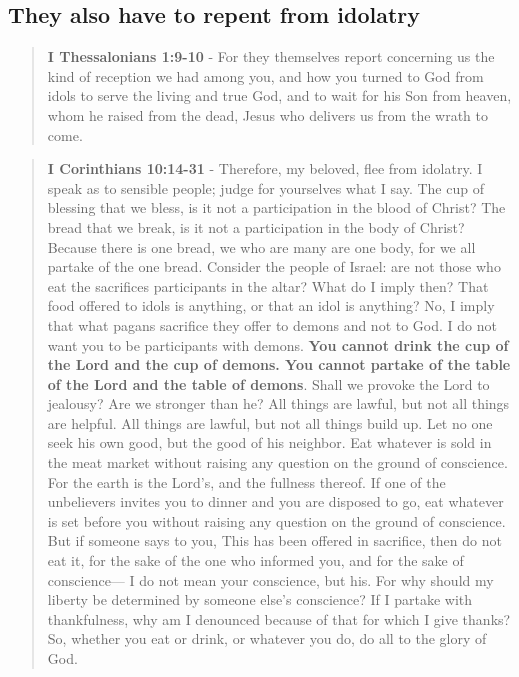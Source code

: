 \documentclass[11pt]{article}
\begin{document}
\subsection{They also have to repent from idolatry}
\label{sec:org8ad32fa}
\begin{quote}
\textbf{I Thessalonians 1:9-10} - For they themselves report concerning us the kind of reception we had among you, and how you turned to God from idols to serve the living and true God, and to wait for his Son from heaven, whom he raised from the dead, Jesus who delivers us from the wrath to come.
\end{quote}

\begin{quote}
\textbf{I Corinthians 10:14-31} - Therefore, my beloved, flee from idolatry. I speak as to sensible people; judge for yourselves what I say. The cup of blessing that we bless, is it not a participation in the blood of Christ? The bread that we break, is it not a participation in the body of Christ? Because there is one bread, we who are many are one body, for we all partake of the one bread. Consider the people of Israel: are not those who eat the sacrifices participants in the altar? What do I imply then? That food offered to idols is anything, or that an idol is anything? No, I imply that what pagans sacrifice they offer to demons and not to God. I do not want you to be participants with demons. \textbf{You cannot drink the cup of the Lord and the cup of demons. You cannot partake of the table of the Lord and the table of demons}. Shall we provoke the Lord to jealousy? Are we stronger than he? All things are lawful, but not all things are helpful. All things are lawful, but not all things build up. Let no one seek his own good, but the good of his neighbor. Eat whatever is sold in the meat market without raising any question on the ground of conscience. For the earth is the Lord's, and the fullness thereof. If one of the unbelievers invites you to dinner and you are disposed to go, eat whatever is set before you without raising any question on the ground of conscience. But if someone says to you, This has been offered in sacrifice, then do not eat it, for the sake of the one who informed you, and for the sake of conscience— I do not mean your conscience, but his. For why should my liberty be determined by someone else's conscience? If I partake with thankfulness, why am I denounced because of that for which I give thanks? So, whether you eat or drink, or whatever you do, do all to the glory of God.
\end{quote}
\end{document}
